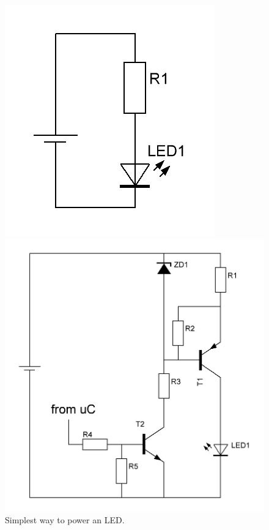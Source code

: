 	\begin{figure}[t]
		\centering
		\begin{minipage}[b]{0.3\textwidth}
			\includegraphics[width=\textwidth]{chapters/hardware-chapters/DC/dc-modulator/dc-led-resistor.jpg}
			\caption{Simplest way to power an LED.}
			\label{fig:dc-led-resistor}
		\end{minipage}
		\hfill
		\begin{minipage}[b]{0.5\textwidth}
			\includegraphics[width=\textwidth]{chapters/hardware-chapters/DC/dc-modulator/dc-led-current-source.jpg}

\end{minipage}
\end{figure}
